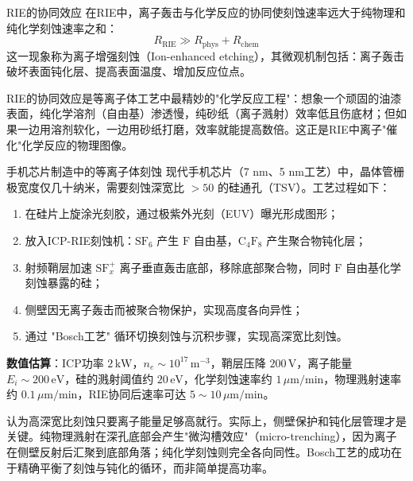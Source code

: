 \begin{theorem}{RIE的协同效应}{}{}
\label{thm:rie-synergy}
在RIE中，离子轰击与化学反应的协同使刻蚀速率远大于纯物理和纯化学刻蚀速率之和：
\begin{equation}
\label{eq:rie-synergy}
R_{\text{RIE}} \gg R_{\text{phys}} + R_{\text{chem}}
\end{equation}
这一现象称为离子增强刻蚀（Ion-enhanced etching），其微观机制包括：离子轰击破坏表面钝化层、提高表面温度、增加反应位点。
\end{theorem}

\begin{insight}{}{}
RIE的协同效应是等离子体工艺中最精妙的"化学反应工程"：想象一个顽固的油漆表面，纯化学溶剂（自由基）渗透慢，纯砂纸（离子溅射）效率低且伤底材；但如果一边用溶剂软化，一边用砂纸打磨，效率就能提高数倍。这正是RIE中离子"催化"化学反应的物理图像。
\end{insight}

\begin{example}{手机芯片制造中的等离子体刻蚀}{}{}
\label{ex:chip-etching}
现代手机芯片（7 nm、5 nm工艺）中，晶体管栅极宽度仅几十纳米，需要刻蚀深宽比 $> 50$ 的硅通孔（TSV）。工艺过程如下：
\begin{enumerate}
\item 在硅片上旋涂光刻胶，通过极紫外光刻（EUV）曝光形成图形；
\item 放入ICP-RIE刻蚀机：$\mathrm{SF}_6$ 产生 $\mathrm{F}$ 自由基，$\mathrm{C}_4\mathrm{F}_8$ 产生聚合物钝化层；
\item 射频鞘层加速 $\mathrm{SF}_x^+$ 离子垂直轰击底部，移除底部聚合物，同时 $\mathrm{F}$ 自由基化学刻蚀暴露的硅；
\item 侧壁因无离子轰击而被聚合物保护，实现高度各向异性；
\item 通过 "Bosch工艺" 循环切换刻蚀与沉积步骤，实现高深宽比刻蚀。
\end{enumerate}
\textbf{数值估算}：ICP功率 $2\,\mathrm{kW}$，$n_e \sim 10^{17}\,\mathrm{m^{-3}}$，鞘层压降 $200\,\mathrm{V}$，离子能量 $E_i \sim 200\,\mathrm{eV}$，硅的溅射阈值约 $20\,\mathrm{eV}$，化学刻蚀速率约 $1\,\mu\mathrm{m}/\mathrm{min}$，物理溅射速率约 $0.1\,\mu\mathrm{m}/\mathrm{min}$，RIE协同后速率可达 $5\sim 10\,\mu\mathrm{m}/\mathrm{min}$。
\end{example}

\begin{warning}{}{}
认为高深宽比刻蚀只要离子能量足够高就行。实际上，侧壁保护和钝化层管理才是关键。纯物理溅射在深孔底部会产生"微沟槽效应"（micro-trenching），因为离子在侧壁反射后汇聚到底部角落；纯化学刻蚀则完全各向同性。Bosch工艺的成功在于精确平衡了刻蚀与钝化的循环，而非简单提高功率。
\end{warning}

